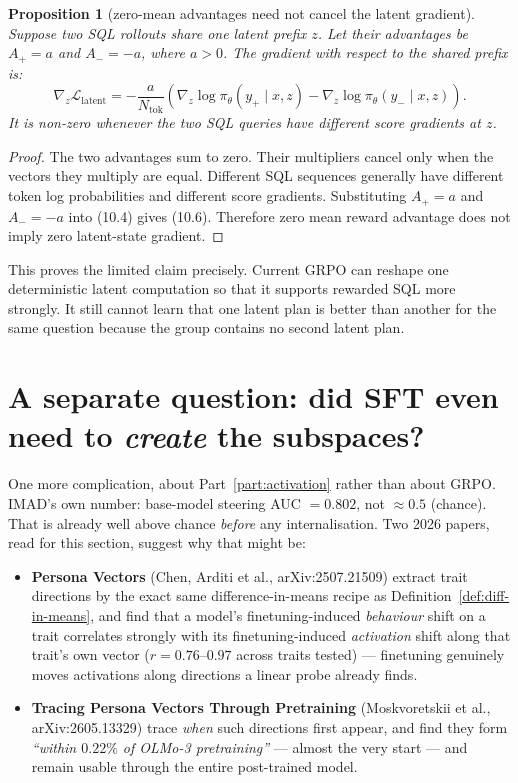 \documentclass[11pt]{article}
\newtheorem{proposition}[theorem]{Proposition}
\theoremstyle{definition}
\begin{document}
\begin{proposition}[zero-mean advantages need not cancel the latent gradient]
Suppose two SQL rollouts share one latent prefix $z$. Let their advantages be $A_+=a$ and $A_-=-a$, where $a>0$. The gradient with respect to the shared prefix is:
\[
\nabla_z\mathcal L_{\mathrm{latent}}
=-\frac{a}{N_{\mathrm{tok}}}
\left(
\nabla_z\log\pi_\theta(y_+\mid x,z)
-\nabla_z\log\pi_\theta(y_-\mid x,z)
\right).
\tag{10.6}
\]
It is non-zero whenever the two SQL queries have different score gradients at $z$.
\end{proposition}

\begin{proof}
The two advantages sum to zero. Their multipliers cancel only when the vectors they multiply are equal. Different SQL sequences generally have different token log probabilities and different score gradients. Substituting $A_+=a$ and $A_-=-a$ into (10.4) gives (10.6). Therefore zero mean reward advantage does not imply zero latent-state gradient.
\end{proof}

This proves the limited claim precisely. Current GRPO can reshape one deterministic latent computation so that it supports rewarded SQL more strongly. It still cannot learn that one latent plan is better than another for the same question because the group contains no second latent plan.

\section{A separate question: did SFT even need to \emph{create} the subspaces?}

One more complication, about Part~\ref{part:activation} rather than about GRPO. IMAD's own number: base-model steering AUC $= 0.802$, not $\approx 0.5$ (chance). That is already well above chance \emph{before} any internalisation. Two 2026 papers, read for this section, suggest why that might be:

\begin{itemize}
\item \textbf{Persona Vectors} (Chen, Arditi et al., arXiv:2507.21509) extract trait directions by the exact same difference-in-means recipe as Definition~\ref{def:diff-in-means}, and find that a model's finetuning-induced \emph{behaviour} shift on a trait correlates strongly with its finetuning-induced \emph{activation} shift along that trait's own vector ($r=0.76$--$0.97$ across traits tested) --- finetuning genuinely moves activations along directions a linear probe already finds.
\item \textbf{Tracing Persona Vectors Through Pretraining} (Moskvoretskii et al., arXiv:2605.13329) trace \emph{when} such directions first appear, and find they form \emph{``within $0.22\%$ of OLMo-3 pretraining''} --- almost the very start --- and remain usable through the entire post-trained model.
\end{itemize}
\end{document}
